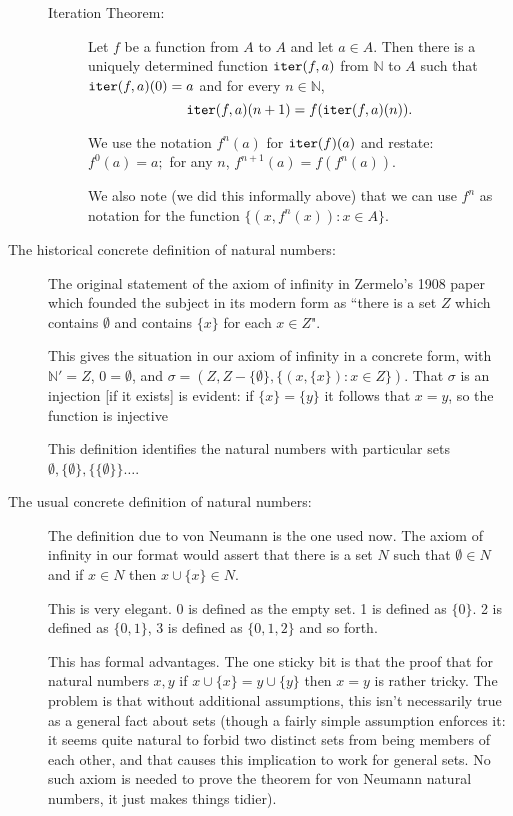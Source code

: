 \documentclass[12pt]{article}
\begin{document}
\begin{description}
\begin{description}

\item[Iteration Theorem:]  Let $f$ be a function from $A$ to $A$ and let $a \in A$.  Then there is a uniquely determined function ${\tt iter}(f,a)$ from $\mathbb N$ to $A$ such that ${\tt iter}(f,a)(0) = a$ and for every $n \in \mathbb N$, $${\tt iter}(f,a)(n+1)= f({\tt iter}(f,a)(n)).$$

We use the notation $f^n(a)$ for ${\tt iter}(f)(a)$ and restate:  $f^0(a)=a;$  for any $n$, $f^{n+1}(a) = f(f^n(a))$.

We also note (we did this informally above)  that we can use $f^n$ as notation for the function $\{(x,f^n(x)):x \in A\}$.

\end{description}

\item[The historical concrete definition of natural numbers:]

The original statement of the axiom of infinity in Zermelo's 1908 paper which founded the subject in its modern form
as ``there is a set $Z$ which contains $\emptyset$ and contains $\{x\}$ for each $x \in Z$".

This gives the situation in our axiom of infinity in a concrete form, with $\mathbb N'=Z$, $0=\emptyset$,
and $\sigma = (Z,Z-\{\emptyset\},\{(x,\{x\}):x \in Z\})$.  That $\sigma$ is an injection [if it exists] is evident:  if $\{x\} = \{y\}$ it follows that $x=y$, so the function is injective

This definition identifies the natural numbers with particular sets $\emptyset, \{\emptyset\}, \{\{\emptyset\}\}\ldots$.

\item[The usual concrete definition of natural numbers:]

The definition due to von Neumann is the one used now.  The axiom of infinity in our format would assert
that there is a set $N$ such that $\emptyset \in N$ and if $x \in N$ then $x \cup \{x\} \in N$.

This is very elegant.  0 is defined as the empty set.  1 is defined as $\{0\}$.  2 is defined as $\{0,1\}$,  3 is defined as $\{0,1,2\}$ and so forth.

This has formal advantages.  The one sticky bit is that the proof that for natural numbers $x,y$ if $x \cup \{x\} = y \cup \{y\}$ then $x=y$ is rather tricky.  The problem is that without additional assumptions, this isn't necessarily true as a general fact about sets (though a fairly simple assumption enforces it:  it seems quite natural to forbid two distinct sets from being members of each other, and that causes this implication to work for general sets.  No such axiom is needed to prove the theorem for von Neumann natural numbers, it just makes things tidier).


\end{description}
\end{document}
